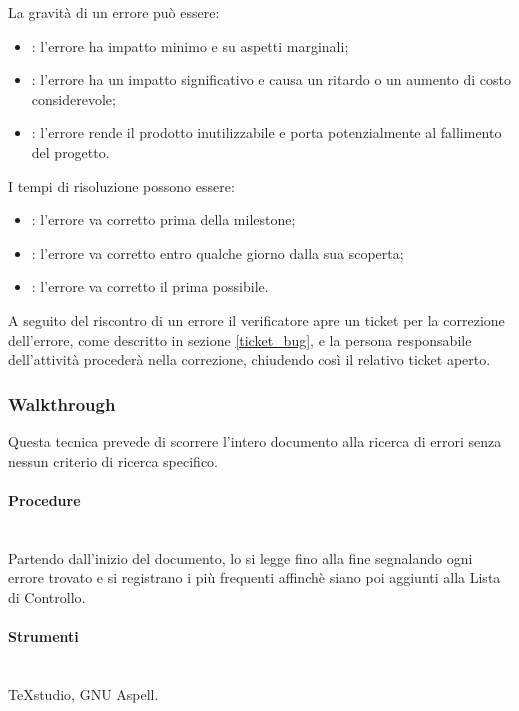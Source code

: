La gravità di un errore può essere:

\begin{itemize}
\item {}: l'errore ha impatto minimo e su aspetti marginali;
\item {}: l'errore ha un impatto significativo e causa un ritardo o un aumento di costo considerevole;
\item {}: l'errore rende il prodotto inutilizzabile e porta potenzialmente al fallimento del progetto.
\end{itemize}

I tempi di risoluzione possono essere:
\begin{itemize}
\item {}: l'errore va corretto prima della milestone;
\item {}: l'errore va corretto entro qualche giorno dalla sua scoperta;
\item {}: l'errore va corretto il prima possibile.
\end{itemize}

A seguito del riscontro di un errore il verificatore apre un ticket per la correzione dell'errore, come descritto in sezione \ref{ticket_bug}, e la persona responsabile dell'attivit\`{a} procederà nella correzione, chiudendo così il relativo ticket aperto.




\subsubsection{Walkthrough}
Questa tecnica prevede di scorrere l'intero documento alla ricerca di errori senza nessun criterio di ricerca specifico.
\paragraph{Procedure} \hfill \\

Partendo dall'inizio del documento, lo si legge fino alla fine segnalando ogni errore trovato e si registrano i più frequenti affinchè siano poi aggiunti alla Lista di Controllo.
\paragraph{Strumenti} \hfill \\

TeXstudio, GNU Aspell.

